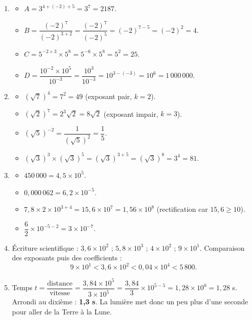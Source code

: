 \documentclass[11pt]{article}
\begin{document}
\begin{corrige}
\begin{enumerate}
    \item
    \begin{itemize}
        \item $A = 3^{4+(-2)+5} = 3^7 = 2187$.
        \item $B = \dfrac{(-2)^7}{(-2)^{3+2}} = \dfrac{(-2)^7}{(-2)^5} = (-2)^{7-5} = (-2)^2 = 4$.
        \item $C = 5^{-2 \times 3} \times 5^8 = 5^{-6} \times 5^8 = 5^{2} = 25$.
        \item $D = \dfrac{10^{-2} \times 10^5}{10^{-3}} = \dfrac{10^{3}}{10^{-3}} = 10^{3-(-3)} = 10^6 = 1\,000\,000$.
    \end{itemize}
    \item
    \begin{itemize}
        \item $(\sqrt{7})^4 = 7^2 = 49$ (exposant pair, $k=2$).
        \item $(\sqrt{2})^7 = 2^3 \sqrt{2} = 8\sqrt{2}$ (exposant impair, $k=3$).
        \item $(\sqrt{5})^{-2} = \dfrac{1}{(\sqrt{5})^2} = \dfrac{1}{5}$.
        \item $(\sqrt{3})^3 \times (\sqrt{3})^5 = (\sqrt{3})^{3+5} = (\sqrt{3})^8 = 3^4 = 81$.
    \end{itemize}
    \item
    \begin{itemize}
        \item $450\,000 = 4,5 \times 10^5$.
        \item $0,000\,062 = 6,2 \times 10^{-5}$.
        \item $7,8 \times 2 \times 10^{3+4} = 15,6 \times 10^7 = 1,56 \times 10^8$ (rectification car $15,6 \ge 10$).
        \item $\dfrac{6}{2} \times 10^{-5-2} = 3 \times 10^{-7}$.
    \end{itemize}
    \item Écriture scientifique : $3,6 \times 10^2$ ; $5,8 \times 10^3$ ; $4 \times 10^2$ ; $9 \times 10^1$. Comparaison des exposants puis des coefficients :
    \[ 9 \times 10^1 < 3,6 \times 10^2 < 0,04 \times 10^4 < 5\,800. \]
    \item Temps $t = \dfrac{\text{distance}}{\text{vitesse}} = \dfrac{3,84 \times 10^5}{3 \times 10^5} = \dfrac{3,84}{3} \times 10^{5-5} = 1,28 \times 10^0 = 1,28$ s.
    Arrondi au dixième : \textbf{1,3 s}. La lumière met donc un peu plus d'une seconde pour aller de la Terre à la Lune.
\end{enumerate}
\end{corrige}
\end{document}
